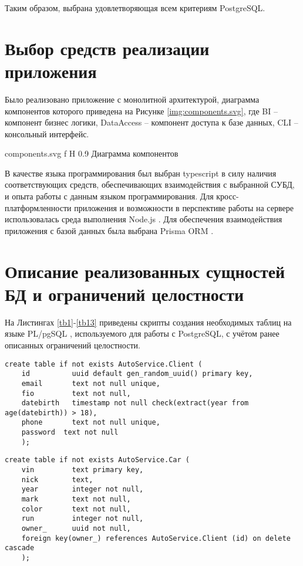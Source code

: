 Таким образом, выбрана удовлетворяющая всем критериям PostgreSQL.

\section{Выбор средств реализации приложения}

Было реализовано приложение с монолитной архитектурой, диаграмма компонентов которого приведена на Рисунке \ref{img:components.svg}, где BI -- компонент бизнес логики, DataAccess -- компонент доступа к базе данных, CLI -- консольный интерфейс.

\myincludesvg
{components.svg} 
{f} 
{H} 
{0.9\textwidth} 
{Диаграмма компонентов}

В качестве языка программирования был выбран typescript \cite{typescript} в силу наличия соответствующих средств, обеспечивающих взаимодействия с выбранной СУБД, и опыта работы с данным языком программирования. 
Для кросс-платформленности приложения и возможности в перспективе работы на сервере использовалась среда выполнения Node.js \cite{nodejs}. 
Для обеспечения взаимодействия приложения с базой данных была выбрана Prisma ORM \cite{prismaorm}.

\section{Описание реализованных сущностей БД и ограничений целостности}

На Листингах \ref{tb1}-\ref{tb13} приведены скрипты создания необходимых таблиц на языке PL/pgSQL \cite{plpgsql}, используемого для работы с PostgreSQL, с учётом ранее описанных ограничений целостности.

\begin{lstlisting}[label=tb1, style=mystyle, caption=Создание таблицы Client и соотвествующих ограничений целостности]
	create table if not exists AutoService.Client (
	id			uuid default gen_random_uuid() primary key,
	email       text not null unique,
	fio         text not null,
	datebirth   timestamp not null check(extract(year from age(datebirth)) > 18),
	phone       text not null unique,
	password  text not null
	);
\end{lstlisting}

\begin{lstlisting}[label=tb2, style=mystyle, caption=Создание таблицы Car и соотвествующих ограничений целостности]
	create table if not exists AutoService.Car (
	vin			text primary key,
	nick       	text,
	year        integer not null,
	mark	   	text not null,
	color       text not null,
	run  		integer not null,
	owner_		uuid not null,
	foreign key(owner_) references AutoService.Client (id) on delete cascade
	);
\end{lstlisting}

